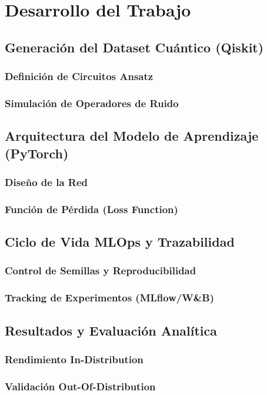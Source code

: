 \chapter{Desarrollo del Trabajo}\label{ch:desarrollo}

\section{Generación del Dataset Cuántico (Qiskit)}
\subsection{Definición de Circuitos Ansatz}
\subsection{Simulación de Operadores de Ruido}

\section{Arquitectura del Modelo de Aprendizaje (PyTorch)}
\subsection{Diseño de la Red}
\subsection{Función de Pérdida (Loss Function)}

\section{Ciclo de Vida MLOps y Trazabilidad}
\subsection{Control de Semillas y Reproducibilidad}
\subsection{Tracking de Experimentos (MLflow/W\&B)}

\section{Resultados y Evaluación Analítica}
\subsection{Rendimiento In-Distribution}
\subsection{Validación Out-Of-Distribution}
